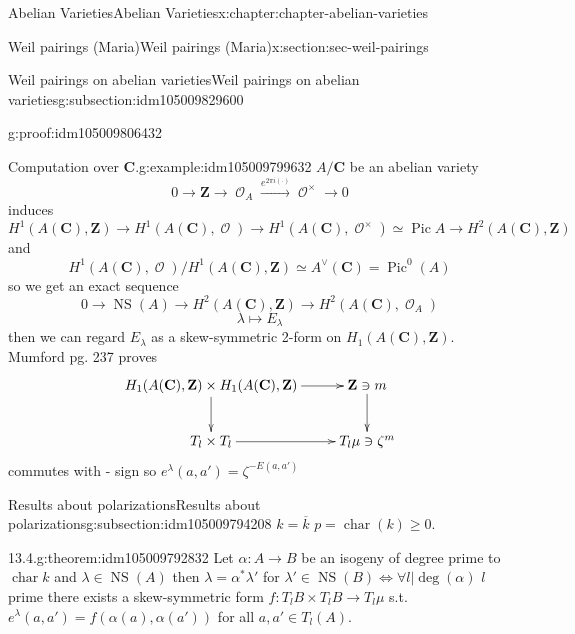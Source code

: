 \documentclass[oneside,10pt,]{book}
\numberwithin{equation}{section}
\newcommand{\sheaf}[1]{\operatorname{\mathcal{#1}}}
\newcommand{\ZZ}{\mathbf{Z}}
\newcommand{\CC}{\mathbf{C}}
\DeclareMathOperator{\Pic}{Pic}
\DeclareMathOperator{\characteristic}{char}
\DeclareMathOperator{\NS}{NS}
\begin{document}
\begin{chapterptx}{Abelian Varieties}{}{Abelian Varieties}{}{}{x:chapter:chapter-abelian-varieties}
\begin{sectionptx}{Weil pairings (Maria)}{}{Weil pairings (Maria)}{}{}{x:section:sec-weil-pairings}
\begin{subsectionptx}{Weil pairings on abelian varieties}{}{Weil pairings on abelian varieties}{}{}{g:subsection:idm105009829600}
\begin{proofptx}{}{g:proof:idm105009806432}
%
\end{proofptx}
\begin{example}{Computation over \(\CC\).}{g:example:idm105009799632}%
\(A/\CC\) be an abelian variety%
\begin{equation*}
0\to \ZZ \to \sheaf O_A \xrightarrow{e^{2\pi i (\cdot)}} \sheaf O^\times \to 0
\end{equation*}
induces%
\begin{equation*}
H^1(A(\CC), \ZZ) \to H^1(A(\CC), \sheaf O) \to H^1(A(\CC), \sheaf O^\times) \simeq \Pic A \to H^2(A(\CC), \ZZ)
\end{equation*}
and%
\begin{equation*}
H^1(A(\CC), \sheaf O)/ H^1(A(\CC), \ZZ) \simeq A^\vee(\CC) = \Pic^0(A)
\end{equation*}
so we get an exact sequence%
\begin{equation*}
0 \to \NS(A) \to H^2 (A(\CC),\ZZ) \to H^2(A(\CC),\sheaf O_A)
\end{equation*}
%
\begin{equation*}
\lambda \mapsto E_\lambda
\end{equation*}
then we can regard \(E_\lambda\) as a skew-symmetric 2-form on \(H_1(A(\CC), \ZZ)\). Mumford pg. 237 proves%
\begin{equation*}
\xymatrix{
H_1(A(\CC), \ZZ) \times H_1(A(\CC), \ZZ) \ar[r] \ar[d] & \ZZ\ni m \ar[d] \\
T_l \times T_l \ar[r] & T_l \mu \ni \zeta^m
}
\end{equation*}
commutes with - sign so \(e^\lambda (a,a') = \zeta^{-E(a,a')}\)%
\end{example}
\end{subsectionptx}
%
%
\typeout{************************************************}
\typeout{************************************************}
%
\begin{subsectionptx}{Results about polarizations}{}{Results about polarizations}{}{}{g:subsection:idm105009794208}
\(k = \overline k\) \(p = \characteristic (k) \ge 0\).%
\begin{theorem}{13.4.}{}{g:theorem:idm105009792832}%
Let \(\alpha\colon A\to B\) be an isogeny of degree prime to \(\characteristic k\) and \(\lambda \in \NS(A)\) then \(\lambda = \alpha^* \lambda '\) for \(\lambda ' \in \NS(B) \iff \forall l |\deg(\alpha)\) \(l\) prime there exists a skew-symmetric form \(f\colon T_lB\times T_lB \to T_l\mu\) s.t. \(e^\lambda(a,a') = f(\alpha(a), \alpha(a'))\) for all \(a,a' \in T_l(A)\).%
\end{theorem}

\end{subsectionptx}
\end{sectionptx}
\end{chapterptx}
\end{document}
